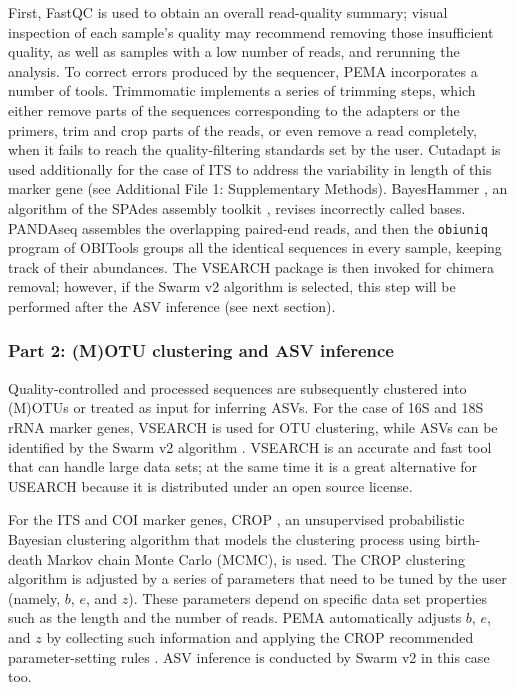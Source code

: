    First, FastQC \citep{fastqc} is used to obtain an overall read-quality summary; 
   visual inspection of each sample's quality may recommend removing those insufficient quality, 
   as well as samples with a low number of reads, and rerunning the analysis. 
   To correct errors produced by the sequencer, PEMA incorporates a number of tools. 
   Trimmomatic \citep{bolger2014trimmomatic} implements a series of trimming steps, 
   which either remove parts of the sequences corresponding to the adapters or the primers, 
   trim and crop parts of the reads, or even remove a read completely, when it fails to reach 
   the quality-filtering standards set by the user. 
   Cutadapt \citep{martin_cutadapt_2011} is used additionally for the case of ITS to address 
   the variability in length of this marker gene (see Additional File 1: Supplementary Methods). 
   BayesHammer \citep{nikolenko2013bayeshammer}, an algorithm of the 
   SPAdes assembly toolkit \citep{bankevich2012spades}, revises incorrectly called bases. 
   PANDAseq \citep{masella2012pandaseq} assembles the overlapping paired-end reads, 
   and then the \texttt{obiuniq} program of OBITools \citep{boyer2016obitools} groups 
   all the identical sequences in every sample, keeping track of their abundances. 
   The VSEARCH package \citep{rognes2016vsearch} is then invoked for chimera removal; 
   however, if the Swarm v2 algorithm is selected, this step will be performed 
   after the ASV inference (see next section).


   \subsubsection*{Part 2: (M)OTU clustering and ASV inference}

   Quality-controlled and processed sequences are subsequently clustered into (M)OTUs or 
   treated as input for inferring ASVs. 
   For the case of 16S and 18S rRNA marker genes, VSEARCH \citep{rognes2016vsearch} 
   is used for OTU clustering, while ASVs can be identified by the 
   Swarm v2 algorithm \citep{mahe2015swarm}. 
   VSEARCH is an accurate and fast tool that can handle large data sets; 
   at the same time it is a great alternative for USEARCH \citep{edgar2010search} 
   because it is distributed under an open source license.

   For the ITS and COI marker genes, CROP \citep{hao2011clustering}, 
   an unsupervised probabilistic Bayesian clustering algorithm that models 
   the clustering process using birth-death Markov chain Monte Carlo (MCMC), is used. 
   The CROP clustering algorithm is adjusted by a series of parameters that need to be 
   tuned by the user (namely, $b$, $e$, and $z$).
   These parameters depend on specific data set properties such as the length 
   and the number of reads. 
   PEMA automatically adjusts $b$, $e$, and $z$ by collecting such information 
   and applying the CROP recommended parameter-setting rules \citep{hao2011clustering}. 
   ASV inference is conducted by Swarm v2 \citep{mahe2015swarm} in this case too.

